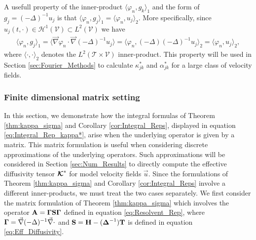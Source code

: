 \documentclass[11pt]{amsart}
\newcommand{\Tb}{\mathbf{T}}
\newcommand{\Hb}{\mathbf{H}}
\newcommand{\Sb}{\mathbf{S}}
\newcommand{\Ab}{\mathbf{A}}
\newcommand\Kbc{\mbox{\boldmath${\mathcal{K}}$}}
\newcommand{\Tc}{\mathcal{T}}
\newcommand{\Vc}{\mathcal{V}}
\newcommand{\Hc}{\mathcal{H}}
\newcommand\bDelta{\mbox{\boldmath${\Delta}$}}
\newcommand\bGamma{\mbox{\boldmath${\Gamma}$}}
\begin{document}
A usefull property of the inner-product $\langle\varphi_n,g_k\rangle_1$ and the form of
$g_j=(-\Delta)^{-1}u_j$ is that $\langle\varphi_n,g_j\rangle_1=\langle\varphi_n,u_j\rangle_2$. More
specifically, since $u_j(t,\cdot)\in\Hc^1(\Vc)\subset L^2(\Vc)$ we have
\cite{Stakgold:BVP:2000}  
%
\begin{align}\label{eq:H1_to_L2}
  \langle\varphi_n,g_j\rangle_1=\langle\vec{\nabla}\varphi_n\cdot\vec{\nabla}(-\Delta)^{-1}u_j\rangle
         =\langle\varphi_n,(-\Delta)(-\Delta)^{-1}u_j\rangle_2
         =\langle\varphi_n,u_j\rangle_2,
\end{align}
%
where $\langle\cdot,\cdot\rangle_2$ denotes the $L^2(\Tc\times\Vc)$ inner-product. This
property will be used in Section \ref{sec:Fourier_Methods} to
calculate $\kappa^*_{jk}$ and $\alpha^*_{jk}$ for a large class of velocity
fields.   



%
\subsubsection{Finite dimensional matrix
  setting} \label{sec:Integral_Rep_Matrix}  
%
In this section, we demonstrate how the integral formulas of Theorem
\ref{thm:kappa_sigma} and Corollary \ref{cor:Integral_Reps}, displayed 
in equation \eqref{eq:Integral_Rep_kappa*}, arise when the underlying
operator is given by a matrix. This matrix formulation is useful when
considering discrete approximations of the underlying operators. Such
approximations will be considered in Section \ref{sec:Num_Results} to
directly compute the effective diffusivity tensor $\Kbc^*$ for model
velocity fields $\vec{u}$. Since the formulations of Theorem
\ref{thm:kappa_sigma} and Corollary \ref{cor:Integral_Reps} involve a
different inner-products, we must treat the two cases separately. We
first consider the matrix formulation of Theorem \ref{thm:kappa_sigma}
which involves the operator $\Ab=\bGamma\Sb\bGamma$ defined in
equation \eqref{eq:Resolvent_Rep}, where
$\bGamma=\vec{\nabla}(-\Delta)^{-1}\vec{\nabla}\cdot$ and $\Sb=\Hb-(\bDelta^{-1})\Tb$ is
defined in equation \eqref{eq:Eff_Diffusivity}.  
\end{document}
